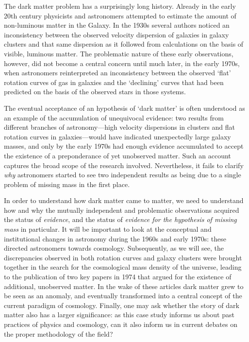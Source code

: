 \documentclass{naturefig}
\begin{document}
The dark matter problem has a surprisingly long history.\cite{Trimble1987,Trimble2013,Sanders2010,Einasto2014,Bertone2016} Already in the early 20th century physicists and astronomers attempted to estimate the amount of non-lumin\-ous matter in the Galaxy.\cite{Kapteyn1922,Jeans1922,Oort1927} In the 1930s several authors noticed an inconsistency between the observed velocity dispersion of galaxies in galaxy clusters and that same dispersion as it followed from calculations on the basis of visible, luminous matter.\cite{Zwicky1933,Smith1936a,Holmberg1937} The problematic nature of these early observations, however, did not become a central concern until much later, in the early 1970s, when astronomers reinterpreted an inconsistency between the observed `flat' rotation curves of gas in galaxies and the `declining' curves that had been predicted on the basis of the observed stars in those systems.\cite{Faber1979}

The eventual acceptance of an hypothesis of `dark matter' is often understood as an example of the accumulation of unequivocal evidence: two results from different branches of astronomy---high velocity dispersions in clusters and flat rotation curves in galaxies---would have indicated unexpectedly large galaxy masses, and only by the early 1970s had enough evidence accumulated to accept the existence of a preponderance of yet unobserved matter.\cite{Riess2015} Such an account captures the broad scope of the research involved. Nevertheless, it fails to clarify \emph{why} astronomers started to see two independent results as being due to a single problem of missing mass in the first place.

In order to understand how dark matter came to matter, we need to understand how and why the mutually independent and problematic observations acquired the status of \emph{evidence}, and the status of \emph{evidence for the hypothesis of missing mass} in particular. It will be important to look at the conceptual and institutional changes in astronomy during the 1960s and early 1970s: these directed astronomers towards cosmology. Subsequently, as we will see, the discrepancies observed in both rotation curves and galaxy clusters were brought together in the search for the cosmological mass density of the universe, leading to the  publication of two key papers in 1974 that argued for the existence of additional, unobserved matter.\cite{Ostriker1974,Einasto1974} In the wake of these articles dark matter grew to be seen as an anomaly, and eventually transformed into a central concept of the current paradigm of cosmology. Finally, one may ask whether the story of dark matter also has a larger significance: as this case study informs us about past practices of physics and cosmology, can it also inform us in current debates on the proper methodology of the field?
\end{document}

